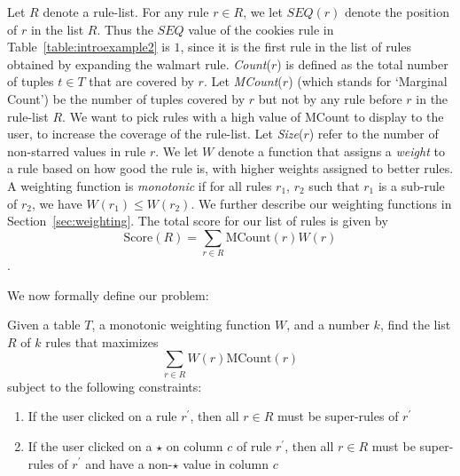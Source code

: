 \documentclass{sig-alternate}
\begin{document}
Let $R$ denote a rule-list. For any rule $r \in R$, we let $SEQ(r)$ denote the position of $r$ in the list $R$. 
Thus the $SEQ$ value of the cookies rule in Table~\ref{table:introexample2} is $1$, since it is the first rule in the list of rules obtained by expanding the walmart rule. {\em Count}($r$) is defined as the total number of tuples $t \in T$ that are covered by $r$. Let {\em MCount}($r$) (which stands for `Marginal Count') be the number of tuples covered by $r$ but not by any rule before $r$ in the rule-list $R$. We want to pick rules with a high value of MCount to display to the user, to increase the coverage of the rule-list. Let {\em Size}($r$) refer to the number of non-starred values in rule $r$. We let $W$ denote a function that assigns a {\em weight} to a rule based on how good the rule is, with higher weights assigned to better rules. A weighting function is {\em monotonic} if for all rules $r_1$, $r_2$ such that $r_1$ is a sub-rule of $r_2$, we have $W(r_1) \leq W(r_2)$. We further describe our weighting functions in Section~\ref{sec:weighting}. The total score for our list of rules is given by $$\text{Score}(R) = \sum_{r \in R} \text{MCount}(r)W(r)$$.

We now formally define our problem:

Given a table $T$, a monotonic weighting function $W$, and a number $k$, find the list $R$ of $k$ rules that maximizes 
$$\sum_{r \in R} W(r)\text{MCount}(r)$$
subject to the following constraints:
\begin{enumerate}
\item If the user clicked on a rule $r^{\prime}$, then all $r \in R$ must be super-rules of $r^{\prime}$
\item If the user clicked on a $\star$ on column $c$ of rule $r^{\prime}$, then all $r \in R$ must be super-rules of $r^{\prime}$ and have a non-$\star$ value in column $c$
\end{enumerate}


\end{document}

